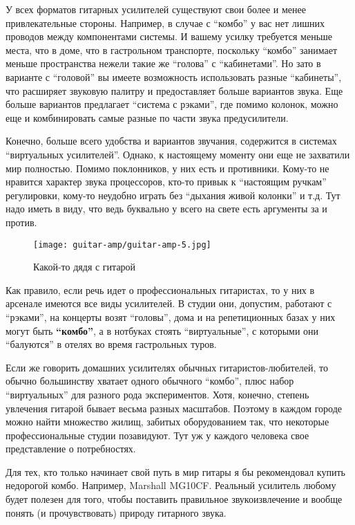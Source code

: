 У всех форматов гитарных усилителей существуют свои более и менее привлекательные стороны. Например, в случае с “комбо” у вас нет лишних проводов между компонентами системы. И вашему усилку требуется меньше места, что в доме, что в гастрольном транспорте, поскольку “комбо” занимает меньше пространства нежели такие же “голова” с “кабинетами”. Но зато в варианте с “головой” вы имеете возможность использовать разные “кабинеты”, что расширяет звуковую палитру и предоставляет больше вариантов звука. Еще больше вариантов предлагает “система с рэками”, где помимо колонок, можно еще и комбинировать самые разные по части звука предусилители.

Конечно, больше всего удобства и вариантов звучания, содержится в системах “виртуальных усилителей”. Однако, к настоящему моменту они еще не захватили мир полностью. Помимо поклонников, у них есть и противники. Кому-то не нравится характер звука процессоров, кто-то привык к “настоящим ручкам” регулировки, кому-то неудобно играть без “дыхания живой колонки” и т.д. Тут надо иметь в виду, что ведь буквально у всего на свете есть аргументы за и против.
\begin{figure}[h]
\centering
\texttt{[image: guitar-amp/guitar-amp-5.jpg]}

\caption{Какой-то дядя с гитарой}
\label{guitar-amp:man-with-guitar}
\end{figure}

Как правило, если речь идет о профессиональных гитаристах, то у них в арсенале имеются все виды усилителей. В студии они, допустим, работают с “рэками”, на концерты возят “головы”, дома и на репетиционных базах у них могут быть \textbf{“комбо”}, а в нотбуках стоять “виртуальные”, с которыми они “балуются” в отелях во время гастрольных туров.

Если же говорить домашних усилителях обычных гитаристов-любителей, то обычно большинству хватает одного обычного “комбо”, плюс набор “виртуальных” для разного рода экспериментов. Хотя, конечно, степень увлечения гитарой бывает весьма разных масштабов. Поэтому в каждом городе можно найти множество жилищ, забитых оборудованием так, что некоторые профессиональные студии позавидуют. Тут уж у каждого человека свое представление о потребностях.

Для тех, кто только начинает свой путь в мир гитары я бы рекомендовал купить недорогой комбо. Например, Marshall MG10CF. Реальный усилитель любому будет полезен для того, чтобы поставить правильное звукоизвлечение и вообще понять (и прочувствовать) природу гитарного звука.